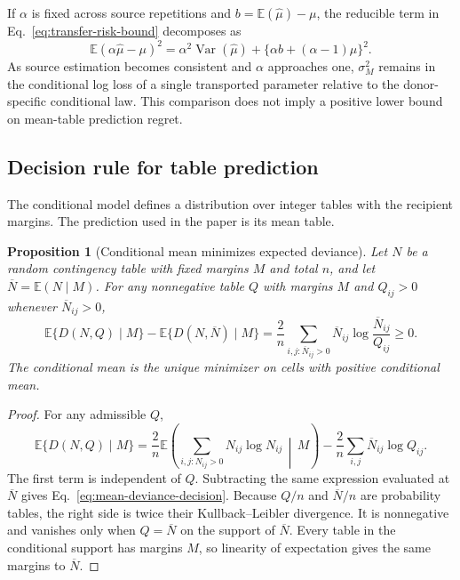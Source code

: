 \documentclass[10pt,a4paper]{article}
\newtheorem{proposition}{Proposition}
\newcommand{\E}{\mathbb{E}}
\begin{document}
If $\alpha$ is fixed across source repetitions and $b=\E(\widehat\mu)-\mu$, the reducible term in Eq.~\eqref{eq:transfer-risk-bound} decomposes as
\begin{equation}
  \E(\alpha\widehat\mu-\mu)^2
  =\alpha^2\operatorname{Var}(\widehat\mu)
  +\{\alpha b+(\alpha-1)\mu\}^2.
  \label{eq:source-risk-decomposition}
\end{equation}
As source estimation becomes consistent and $\alpha$ approaches one, $\sigma_M^2$ remains in the conditional log loss of a single transported parameter relative to the donor-specific conditional law. This comparison does not imply a positive lower bound on mean-table prediction regret.

\subsection{Decision rule for table prediction}

The conditional model defines a distribution over integer tables with the recipient margins. The prediction used in the paper is its mean table.

\begin{proposition}[Conditional mean minimizes expected deviance]
Let $N$ be a random contingency table with fixed margins $M$ and total $n$, and let $\overline N=\E(N\mid M)$. For any nonnegative table $Q$ with margins $M$ and $Q_{ij}>0$ whenever $\overline N_{ij}>0$,
\begin{equation}
  \E\{D(N,Q)\mid M\}-\E\{D(N,\overline N)\mid M\}
  =\frac{2}{n}\sum_{i,j:\overline N_{ij}>0}
  \overline N_{ij}\log\frac{\overline N_{ij}}{Q_{ij}}\geq0.
  \label{eq:mean-deviance-decision}
\end{equation}
The conditional mean is the unique minimizer on cells with positive conditional mean.
\end{proposition}

\begin{proof}
For any admissible $Q$,
\[
  \E\{D(N,Q)\mid M\}
  =\frac{2}{n}\E\!\left(\sum_{i,j:N_{ij}>0}N_{ij}\log N_{ij}\,\middle|\,M\right)
  -\frac{2}{n}\sum_{i,j}\overline N_{ij}\log Q_{ij}.
\]
The first term is independent of $Q$. Subtracting the same expression evaluated at $\overline N$ gives Eq.~\eqref{eq:mean-deviance-decision}. Because $Q/n$ and $\overline N/n$ are probability tables, the right side is twice their Kullback--Leibler divergence. It is nonnegative and vanishes only when $Q=\overline N$ on the support of $\overline N$. Every table in the conditional support has margins $M$, so linearity of expectation gives the same margins to $\overline N$.
\end{proof}
\end{document}
